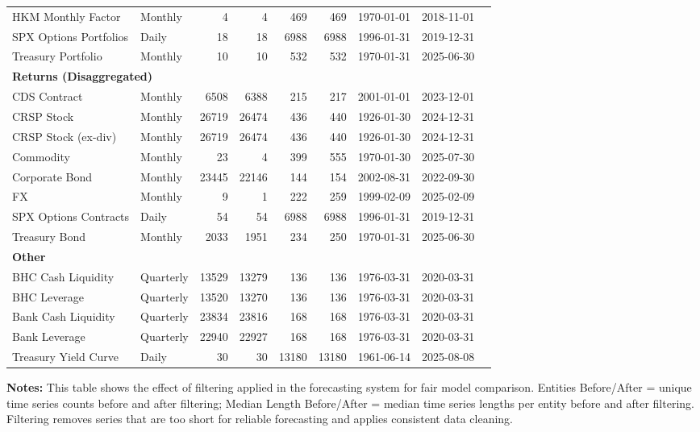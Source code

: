 \begin{table}[htbp]
\begin{tabular}{@{}llrrrrlll@{}}
HKM Monthly Factor & Monthly & 4 & 4 & 469 & 469 & 1970-01-01 & 2018-11-01 \\
SPX Options Portfolios & Daily & 18 & 18 & 6988 & 6988 & 1996-01-31 & 2019-12-31 \\
Treasury Portfolio & Monthly & 10 & 10 & 532 & 532 & 1970-01-31 & 2025-06-30 \\
\midrule
\multicolumn{8}{l}{\textbf{Returns (Disaggregated)}} \\
CDS Contract & Monthly & 6508 & 6388 & 215 & 217 & 2001-01-01 & 2023-12-01 \\
CRSP Stock & Monthly & 26719 & 26474 & 436 & 440 & 1926-01-30 & 2024-12-31 \\
CRSP Stock (ex-div) & Monthly & 26719 & 26474 & 436 & 440 & 1926-01-30 & 2024-12-31 \\
Commodity & Monthly & 23 & 4 & 399 & 555 & 1970-01-30 & 2025-07-30 \\
Corporate Bond & Monthly & 23445 & 22146 & 144 & 154 & 2002-08-31 & 2022-09-30 \\
FX & Monthly & 9 & 1 & 222 & 259 & 1999-02-09 & 2025-02-09 \\
SPX Options Contracts & Daily & 54 & 54 & 6988 & 6988 & 1996-01-31 & 2019-12-31 \\
Treasury Bond & Monthly & 2033 & 1951 & 234 & 250 & 1970-01-31 & 2025-06-30 \\
\midrule
\multicolumn{8}{l}{\textbf{Other}} \\
BHC Cash Liquidity & Quarterly & 13529 & 13279 & 136 & 136 & 1976-03-31 & 2020-03-31 \\
BHC Leverage & Quarterly & 13520 & 13270 & 136 & 136 & 1976-03-31 & 2020-03-31 \\
Bank Cash Liquidity & Quarterly & 23834 & 23816 & 168 & 168 & 1976-03-31 & 2020-03-31 \\
Bank Leverage & Quarterly & 22940 & 22927 & 168 & 168 & 1976-03-31 & 2020-03-31 \\
Treasury Yield Curve & Daily & 30 & 30 & 13180 & 13180 & 1961-06-14 & 2025-08-08 \\
\bottomrule
\end{tabular}
\vspace{0.1cm}
\begin{minipage}{\textwidth}
\scriptsize
\textbf{Notes:} This table shows the effect of filtering applied in the forecasting system for fair model comparison. 
Entities Before/After = unique time series counts before and after filtering; 
Median Length Before/After = median time series lengths per entity before and after filtering. 
Filtering removes series that are too short for reliable forecasting and applies consistent data cleaning.
\end{minipage}
\end{table}